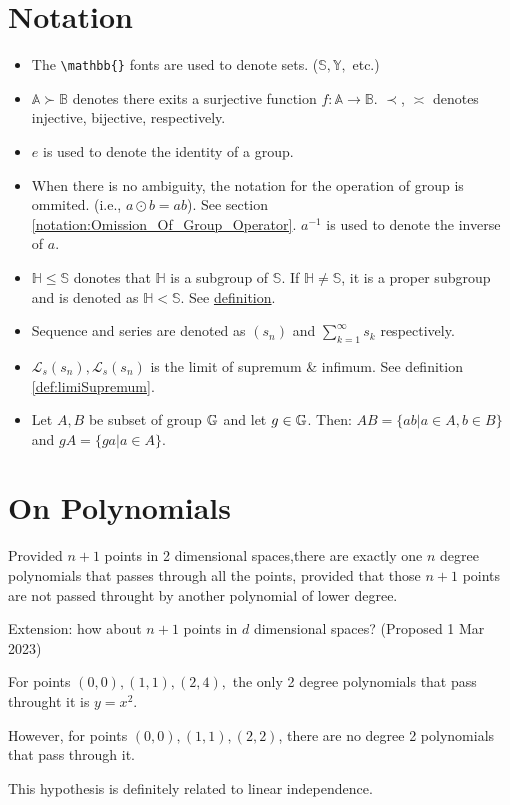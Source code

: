 \documentclass[../note.tex]{subfiles}
\begin{document}
\renewcommand{\thechapter}{\Roman{chapter}}
\chapter{Notation}
\begin{itemize}
	\item The \verb|\mathbb{}| fonts are used to denote sets. ($\mathbb{S}, \mathbb{Y},$ etc.)
	\item $\mathbb{A} \succ \mathbb{B}$ denotes there exits a surjective function $f:\mathbb{A}\rightarrow \mathbb{B}$. $\prec$, $\asymp$ denotes injective, bijective, respectively.
	\item $e$ is used to denote the identity of a group.
	\item When there is no ambiguity, the notation for the operation of group is ommited. (i.e., $a \odot b = ab$). See section \ref{notation:Omission_Of_Group_Operator}.
		$a^{-1}$ is used to denote the inverse of $a$.
	\item $\mathbb{H}\leq \mathbb{S}$ donotes that $\mathbb{H}$ is a subgroup of $\mathbb{S}$. If $\mathbb{H}\neq \mathbb{S}$, it is a proper subgroup and is denoted as $\mathbb{H}<\mathbb{S}$. See \hyperlink{def:subgroup}{definition}.
	\item Sequence and series are denoted as $(s_n)$ and $\sum^{\infty}_{k=1}s_k$ respectively.
	\item $\mathcal{L}_s(s_n), \mathcal{L}_s(s_n)$ is the limit of supremum \& infimum. See definition \ref{def:limiSupremum}.
	\item Let $A, B$ be subset of group $\mathbb{G}$ and let $g \in \mathbb{G}$. Then:
$AB = \{ab|a\in A, b\in B\}$ and $gA = \{ga|a\in A\}$. 

\end{itemize}

\chapter{On Polynomials}
\label{appendix:hypotheises}
\begin{hypothesis}
	Provided $n+1$ points in 2 dimensional spaces,there are exactly one $n$ degree polynomials that passes through all the points, provided that those $n+1$ points are not passed throught by another polynomial of lower degree.

	Extension: how about $n+1$ points in $d$ dimensional spaces? (Proposed 1 Mar 2023)
\end{hypothesis}

\begin{example}
	For points $(0,0), (1,1), (2,4),$ the only 2 degree polynomials that pass throught it is $y=x^2$.

	However, for points $(0,0), (1,1), (2,2)$, there are no degree 2 polynomials that pass through it. 

	This hypothesis is definitely related to linear independence.
\end{example}
\end{document}
